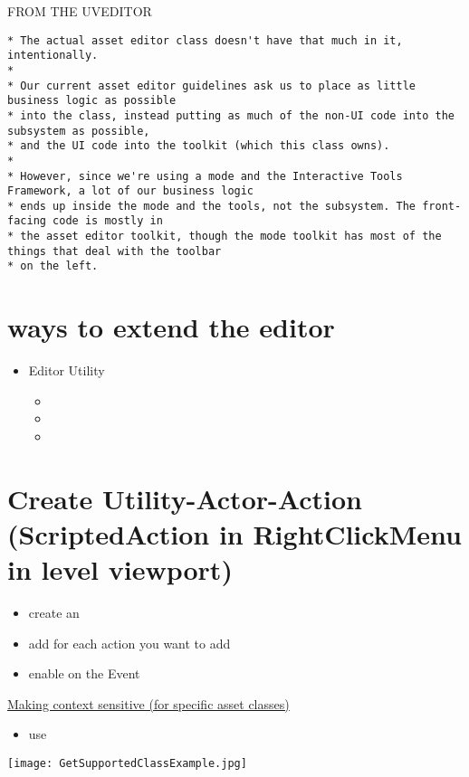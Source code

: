         FROM THE UVEDITOR
        \begin{lstlisting}
* The actual asset editor class doesn't have that much in it, intentionally. 
* 
* Our current asset editor guidelines ask us to place as little business logic as possible
* into the class, instead putting as much of the non-UI code into the subsystem as possible,
* and the UI code into the toolkit (which this class owns).
*
* However, since we're using a mode and the Interactive Tools Framework, a lot of our business logic
* ends up inside the mode and the tools, not the subsystem. The front-facing code is mostly in
* the asset editor toolkit, though the mode toolkit has most of the things that deal with the toolbar
* on the left.
        \end{lstlisting}

    \section{ways to extend the editor}
        \begin{itemize}
            \item Editor Utility
            \begin{itemize}
                \item {}
                \item {}
                \item {}
            \end{itemize}
        \end{itemize}

        
    \section{Create Utility-Actor-Action (ScriptedAction in RightClickMenu in level viewport)}
        
        \begin{itemize}
            \item create an 
            \item add  for each action you want to add
            \item enable  on the Event
        \end{itemize}    
        
        \uline{Making  context sensitive (for specific asset classes)}
        \begin{itemize}
            \item use 
        \end{itemize}
        \texttt{[image: GetSupportedClassExample.jpg]}


